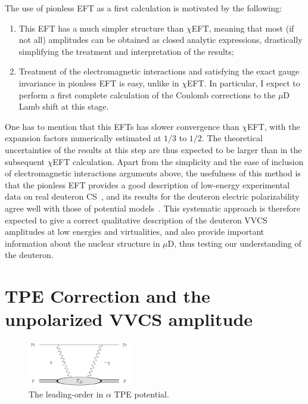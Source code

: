 \documentclass[prl,
twocolumn,
showpacs,preprintnumbers,amsmath,amssymb,
superscriptaddress,
a4paper,nofootinbib,longbibliography]{revtex4-2}
\begin{document}
The use of pionless EFT as a first calculation is motivated by the following:
\begin{enumerate}
 \item This EFT has a much simpler structure than $\chi$EFT, meaning that most (if not all) amplitudes can be obtained as closed
analytic expressions, drastically simplifying the treatment and interpretation of the results;
 \item Treatment of the electromagnetic interactions and satisfying the exact gauge invariance in pionless EFT is easy, unlike in $\chi$EFT.
 In particular, I expect to perform a first complete calculation of the Coulomb corrections to the $\mu$D Lamb shift at this stage.
\end{enumerate}
One has to mention that this EFTs has slower convergence than $\chi$EFT, with the expansion factors numerically estimated at $1/3$ to $1/2$.
The theoretical uncertainties of the results at this step are thus expected to be larger than in the subsequent $\chi$EFT calculation.
Apart from the simplicity and the ease of inclusion of electromagnetic interactions arguments above, the usefulness of this method is that
the pionless EFT provides a good description of low-energy experimental data on real deuteron CS~\cite{Griesshammer:2000mi,Chen:2004wv}, and
its results for the deuteron electric polarizability agree well with those of potential models~\cite{Chen:1999tn}. This systematic approach is therefore expected to
give a correct qualitative description of the deuteron VVCS amplitudes at low energies and virtualities,
and also provide important information about the nuclear structure in $\mu$D, thus testing our understanding of the deuteron.



\section{TPE Correction and the unpolarized VVCS amplitude}

\begin{figure}[ht]
\label{fig:TPE}
\includegraphics[width=0.4\textwidth]{figs/TPE_generic_graph.pdf}
\caption{The leading-order in $\alpha$ TPE potential. }
\end{figure}
\end{document}
